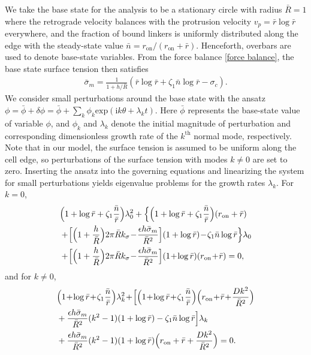 \documentclass[12pt]{article}
\newcommand{\ii}{\mathrm{i}}
\begin{document}
        We take the base state for the analysis to be a stationary circle with radius $\bar{R} = 1$ where the retrograde velocity balances with the protrusion velocity $v_p = \bar{r}\log \bar{r}$ everywhere, and the fraction of bound linkers is uniformly distributed along the edge with the steady-state value $\bar{n} = r_{\text{on}}/(r_{\text{on}} + \bar{r})$. Henceforth, overbars are used to denote base-state variables.  
        From the force balance \eqref{force balance}, the base state surface tension then satisfies
        \begin{align}
            \bar{\sigma}_{m} = \frac{1}{1+h/\bar{R}}(\bar{r}\log \bar{r} + \zeta_1 \bar{n} \log \bar{r} - \sigma_c). 
        \end{align}
        We consider small perturbations around the base state with the ansatz $\phi = \bar{\phi} + \delta \phi = \bar{\phi} + \sum_k \phi_k \text{exp}(\ii k\theta + \lambda_k t)$. 
        Here $\bar{\phi}$ represents the base-state value of variable $\phi$, and $\phi_k$ and $\lambda_k$ denote the initial magnitude of perturbation and corresponding dimensionless growth rate of the $k^\mathrm{th}$ normal mode, respectively.  
        Note that in our model, the surface tension is assumed to be uniform along the cell edge, so perturbations of the surface tension with modes $k\ne 0$ are set to zero. 
        Inserting the ansatz into the governing equations and linearizing the system for small perturbations yields eigenvalue problems for the growth rates $\lambda_k$. For $k=0$,
        \begin{align}
            &  \Big(1+\log \bar{r} + \zeta_1\frac{\bar{n}}{\bar{r}}\Big)\lambda_0^2 
            + 
             \Big\{\Big(1+\log \bar{r} + \zeta_1\frac{\bar{n}}{\bar{r}}\Big)(r_{\text{on}} + \bar{r})  \notag \\
            & +\!\Big[\Big(1+\frac{h}{\bar{R}}\Big)2\pi \bar{R} k_\sigma \!-\! \frac{\epsilon h\bar{\sigma}_{m}}{\bar{R}^2}\Big](1+\log \bar{r}) \!-\! \zeta_1 \bar{n}\log \bar{r}\Big\}\lambda_0 \notag \\
            & +\! \Big[\Big(1+\frac{h}{\bar{R}}\Big)2\pi \bar{R} k_\sigma \!-\! \frac{\epsilon h\bar{\sigma}_{m}}{\bar{R}^2}\Big](1\!+\!\log \bar{r})(r_{\text{on}} \!+\! \bar{r}) = 0,
        \end{align}
        and for $k\neq 0$,
        \begin{align}
            &   \Big(1\!+\!\log \bar{r} \!+\! \zeta_1\frac{\bar{n}}{\bar{r}}\Big)\lambda_k^2 \!+\! %
             \Big[ \Big(1\!+\!\log \bar{r} \!+\! \zeta_1\frac{\bar{n}}{\bar{r}}\Big)\Big(r_{\text{on}}\!+\!\bar{r} \!+\! \frac{Dk^2}{\bar{R}^2}\Big)  \notag \\
            & +\frac{\epsilon h\bar{\sigma}_{m}}{\bar{R}^2}(k^2-1)(1+\log \bar{r}) - \zeta_1 \bar{n}\log \bar{r}\Big]\lambda_k \notag \\
            & + \frac{\epsilon h\bar{\sigma}_{m}}{\bar{R}^2}(k^2-1)(1+\log \bar{r})\Big(r_{\text{on}}+\bar{r}+\frac{Dk^2}{\bar{R}^2}\Big) = 0. 
        \end{align}
\end{document}
